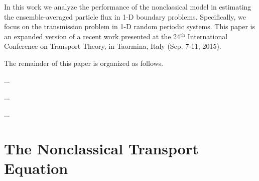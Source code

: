\documentclass[12pt]{article}
\begin{document}
In this work we analyze the performance of the nonclassical model in estimating the ensemble-averaged particle flux in 1-D boundary problems.
Specifically, we focus on the transmission problem in 1-D random periodic systems.
This paper is an expanded version of a recent work presented at the 24$^{\text{th}}$ International Conference on Transport Theory, in Taormina, Italy (Sep. 7-11, 2015).

The remainder of this paper is organized as follows. 

...

...

...

\section{The Nonclassical Transport Equation}\label{sec2}
\end{document}
